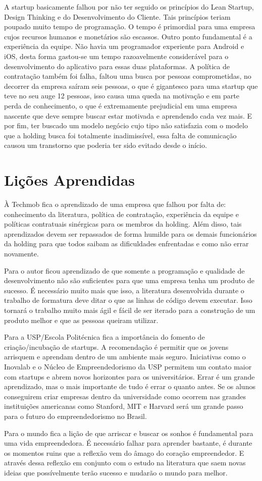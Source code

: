 A startup basicamente falhou por não ter seguido os princípios do Lean Startup, Design Thinking e do Desenvolvimento do Cliente. Tais princípios teriam poupado muito tempo de programação. O tempo é primordial para uma empresa cujos recursos humanos e monetários são escassos. Outro ponto fundamental é a experiência da equipe. Não havia um programador experiente para Android e iOS, desta forma gastou-se um tempo razoavelmente considerável para o desenvolvimento do aplicativo para essas duas plataformas. A política de contratação também foi falha, faltou uma busca por pessoas comprometidas, no decorrer da empresa saíram seis pessoas, o que é gigantesco para uma startup que teve no seu auge 12 pessoas, isso causa uma queda na motivação e em parte perda de conhecimento, o que é extremamente prejudicial em uma empresa nascente que deve sempre buscar estar motivada e aprendendo cada vez mais. E por fim, ter buscado um modelo negócio cujo tipo não satisfazia com o modelo que a holding busca foi totalmente inadimissível, essa falta de comunicação causou um transtorno que poderia ter sido evitado desde o início.

\section{Lições Aprendidas}
\label{sec:licoes_aprendidas}

À Techmob fica o aprendizado de uma empresa que falhou por falta de: conhecimento da literatura, política de contratação, experiência da equipe e políticas contratuais sinérgicas para os membros da holding. Além disso, tais aprendizados devem ser repassados de forma humilde para os demais funcionários da holding para que todos saibam as dificuldades enfrentadas e como não errar novamente.

Para o autor ficou aprendizado de que somente a programação e qualidade de desenvolvimento não são suficientes para que uma empresa tenha um produto de sucesso. É necessário muito mais que isso, a literatura desenvolvida durante o trabalho de formatura deve ditar o que as linhas de código devem executar. Isso tornará o trabalho muito mais ágil e fácil de ser iterado para a construção de um produto melhor e que as pessoas queiram utilizar.

Para a USP/Escola Politécnica fica a importância do fomento de criação/incubação de startups. A recomendação é permitir que os jovens arrisquem e aprendam dentro de um ambiente mais seguro. Iniciativas como o Inovalab e o Núcleo de Empreendedorismo da USP permitem um contato maior com startups e abrem novos horizontes para os universitários. Errar é um grande aprendizado, mas o mais importante de tudo é errar o quanto antes. Se os alunos conseguirem criar empresas dentro da universidade como ocorrem nas grandes instituições americanas como Stanford, MIT e Harvard será um grande passo para o futuro do empreendedorismo no Brasil.

Para o mundo fica a lição de que arriscar e buscar os sonhos é fundamental para uma vida empreendedora. É necessário falhar para aprender bastante, é durante os momentos ruins que a reflexão vem do âmago do coração empreendedor. E através dessa reflexão em conjunto com o estudo na literatura que saem novas ideias que possívelmente terão sucesso e mudarão o mundo para melhor.
